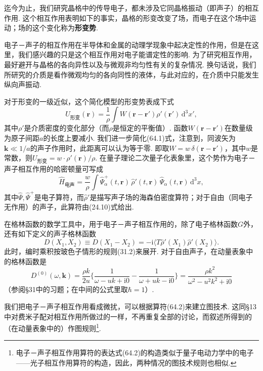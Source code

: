 迄今为止，我们研究晶格中的传导电子，都未涉及它同晶格振动（即声子）的相互作用. 这个相互作用表明如下的事实，晶格的形变改变了场，而电子在这个场中运动；场的这个变化称为\textbf{形变势}.

电子－声子的相互作用在半导体和金属的动理学现象中起决定性的作用，但是在这里，我们感兴趣的只是这个相互作用对电子能谱定性的影响. 为了研究相互作用，最好避开与晶格的各向异性以及与微观非均匀性有关的复杂情况. 换句话说，我们所研究的介质是看作微观均匀的各向同性的液体，与此对应的，在介质中只能发生纵向声振动.

对于形变的一级近似，这个简化模型的形变势表成下式
\begin{equation}
U_{\text{形变}}(\bm{r})=\frac{1}{\rho}\int
W(\bm{r}-\bm{r}')\rho'(\bm{r}')\,\mathrm{d}^3x',
\end{equation}
其中$\rho'$是介质密度的变化部分（而$\rho$是恒定的平衡值）. 函数$W(\bm{r}-\bm{r}')$在数量级为原子间距$a$的长度上要减小. 我们进一步简化(64.1)式，注意到，同波矢为$\bm{k}\ll1/a$的声子作用时，此距离可以认为等于零. 即取$W=w\,\delta(\bm{r}-\bm{r}')$，其中$w$是常数，则$U_{\text{形变}}=w\cdot\rho'(\bm{r})/\rho$. 在量子理论二次量子化表象里，这个势作为电子－声子相互作用的哈密顿量可写成
\begin{equation}
\hat{H}_{\text{电声}}=\frac{w}{\rho}\int
\hat{\varPsi}^{+}_\alpha(t,\bm{r})\,\hat{\rho}'(t,\bm{r})\,
\hat{\varPsi}_\alpha(t,\bm{r})\,\mathrm{d}^3x,
\end{equation}
其中$\hat{\varPsi},\hat{\varPsi}^{+}$是电子算符，而$\hat{\rho}'$是描写声子场的海森伯密度算符；对于自由（同电子无作用）的声子，此算符由(24.10)式给出.

在格林函数的数学工具中，用于电子－声子相互作用的，除了电子格林函数$G$外，还有如下定义的声子格林函数
\begin{equation}
D(X_1,X_2)\equiv D(X_1-X_2)
=-\mathrm{i}\langle T\hat{\rho}'(X_1)\hat{\rho}'(X_2)\rangle.
\end{equation}
此时，编时乘积按玻色子情形的规则(31.2)来展开. 对于自由声子，在动量表象中的格林函数是
\begin{equation}
D^{(0)}(\omega,\bm{k})=\frac{\rho k}{2u}
\biggl\{\frac{1}{\omega-uk+\mathrm{i}0}
-\frac{1}{\omega+uk-\mathrm{i}0}\biggr\}
=\frac{\rho k^2}{\omega^2-u^2k^2+\mathrm{i}0}
\end{equation}
（参阅§31中的习题；在中间的公式里取$\hbar=1$）.

我们把电子－声子相互作用看成微扰，可以根据算符(64.2)来建立图技术. 这同§13中对费米子配对相互作用所做过的一样，不再重复全部的讨论，而叙述所得到的（在动量表象中的）作图规则\footnote{电子－声子相互作用算符的表达式(64.2)的构造类似于量子电动力学中的电子——光子相互作用算符的构造，因此，两种情况的图技术规则也相似.}.

